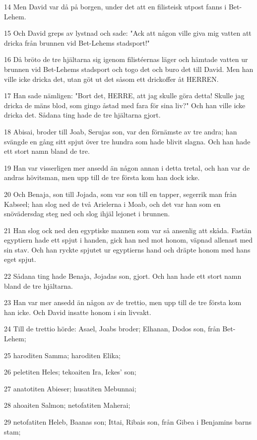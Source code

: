 \par 14 Men David var då på borgen, under det att en filisteisk utpost fanns i Bet-Lehem.
\par 15 Och David greps av lystnad och sade: "Ack att någon ville giva mig vatten att dricka från brunnen vid Bet-Lehems stadsport!"
\par 16 Då bröto de tre hjältarna sig igenom filistéernas läger och hämtade vatten ur brunnen vid Bet-Lehems stadsport och togo det och buro det till David. Men han ville icke dricka det, utan göt ut det såsom ett drickoffer åt HERREN.
\par 17 Han sade nämligen: "Bort det, HERRE, att jag skulle göra detta! Skulle jag dricka de mäns blod, som gingo åstad med fara för sina liv?" Och han ville icke dricka det. Sådana ting hade de tre hjältarna gjort.
\par 18 Abisai, broder till Joab, Serujas son, var den förnämste av tre andra; han svängde en gång sitt spjut över tre hundra som hade blivit slagna. Och han hade ett stort namn bland de tre.
\par 19 Han var visserligen mer ansedd än någon annan i detta tretal, och han var de andras hövitsman, men upp till de tre första kom han dock icke.
\par 20 Och Benaja, son till Jojada, som var son till en tapper, segerrik man från Kabseel; han slog ned de två Arielerna i Moab, och det var han som en snövädersdag steg ned och slog ihjäl lejonet i brunnen.
\par 21 Han slog ock ned den egyptiske mannen som var så ansenlig att skåda. Fastän egyptiern hade ett spjut i handen, gick han ned mot honom, väpnad allenast med sin stav. Och han ryckte spjutet ur egyptierns hand och dräpte honom med hans eget spjut.
\par 22 Sådana ting hade Benaja, Jojadas son, gjort. Och han hade ett stort namn bland de tre hjältarna.
\par 23 Han var mer ansedd än någon av de trettio, men upp till de tre första kom han icke. Och David insatte honom i sin livvakt.
\par 24 Till de trettio hörde: Asael, Joabs broder; Elhanan, Dodos son, från Bet-Lehem;
\par 25 haroditen Samma; haroditen Elika;
\par 26 peletiten Heles; tekoaiten Ira, Ickes' son;
\par 27 anatotiten Abieser; husatiten Mebunnai;
\par 28 ahoaiten Salmon; netofatiten Maherai;
\par 29 netofatiten Heleb, Baanas son; Ittai, Ribais son, från Gibea i Benjamins barns stam;
